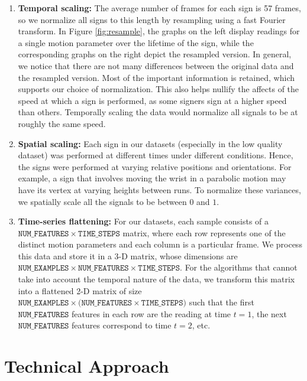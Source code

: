 \documentclass[twocolumn]{article}
\begin{document}
\begin{enumerate}
\item \textbf{Temporal scaling:} The average number of frames for each sign is 57 frames, so we normalize all signs to this length by resampling using a fast Fourier transform. In Figure \ref{fig:resample}, the graphs on the left display readings for a single motion parameter over the lifetime of the sign, while the corresponding graphs on the right depict the resampled version. In general, we notice that there are not many differences between the original data and the resampled version. Most of the important information is retained, which supports our choice of normalization. This also helps nullify the affects of the speed at which a sign is performed, as some signers sign at a higher speed than others. Temporally scaling the data would normalize all signals to be at roughly the same speed.
\item \textbf{Spatial scaling:} Each sign in our datasets (especially in the low quality dataset) was performed at different times under different conditions. Hence, the signs were performed at varying relative positions and orientations. For example, a sign that involves moving the wrist in a parabolic motion may have its vertex at varying heights between runs. To normalize these variances, we spatially scale all the signals to be between $0$ and $1$.
\item \textbf{Time-series flattening:} For our datasets, each sample consists of a $\mathtt{NUM\_FEATURES} \times \mathtt{TIME\_STEPS}$ matrix, where each row represents one of the distinct motion parameters and each column is a particular frame. We process this data and store it in a 3-D matrix, whose dimensions are $\mathtt{NUM\_EXAMPLES} \times \mathtt{NUM\_FEATURES} \times \mathtt{TIME\_STEPS}$. For the algorithms that cannot take into account the temporal nature of the data, we transform this matrix into a flattened 2-D matrix of size $\mathtt{NUM\_EXAMPLES} \times \mathtt{(NUM\_FEATURES} \times \mathtt{TIME\_STEPS)}$ such that the first $\mathtt{NUM\_FEATURES}$ features in each row are the reading at time $t=1$, the next $\mathtt{NUM\_FEATURES}$ features correspond to time $t=2$, etc.
\end{enumerate}

\section{Technical Approach}
\end{document}

